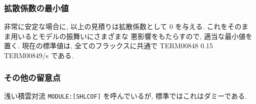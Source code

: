 \subsubsection{拡散係数の最小値}

非常に安定な場合に, 以上の見積りは拡散係数として 0 を与える.
これをそのまま用いるとモデルの振舞いにさまざまな
悪影響をもたらすので, 適当な最小値を置く.
現在の標準値は, 全てのフラックスに共通で
TERM00848 0.15 TERM00849/s である.

\subsubsection{その他の留意点}

浅い積雲対流 \texttt{MODULE:[SHLCOF]} を呼んでいるが, 
標準ではこれはダミーである.
